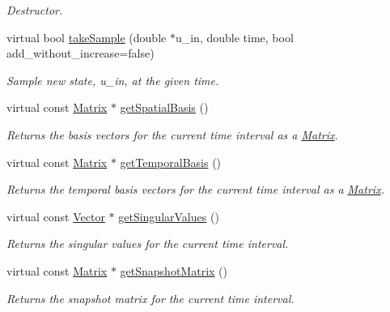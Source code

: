 \begin{DoxyCompactItemize}
\begin{DoxyCompactList}\small\item\em Destructor. \end{DoxyCompactList}\item 
virtual bool \hyperlink{class_c_a_r_o_m_1_1_incremental_s_v_d_ae9a4f1868de20c86bf1cf06352f9ce6c}{take\-Sample} (double $\ast$u\-\_\-in, double time, bool add\-\_\-without\-\_\-increase=false)
\begin{DoxyCompactList}\small\item\em Sample new state, u\-\_\-in, at the given time. \end{DoxyCompactList}\item 
virtual const \hyperlink{class_c_a_r_o_m_1_1_matrix}{Matrix} $\ast$ \hyperlink{class_c_a_r_o_m_1_1_incremental_s_v_d_a97b0d351b594c3fec9d335bac66c7894}{get\-Spatial\-Basis} ()
\begin{DoxyCompactList}\small\item\em Returns the basis vectors for the current time interval as a \hyperlink{class_c_a_r_o_m_1_1_matrix}{Matrix}. \end{DoxyCompactList}\item 
virtual const \hyperlink{class_c_a_r_o_m_1_1_matrix}{Matrix} $\ast$ \hyperlink{class_c_a_r_o_m_1_1_incremental_s_v_d_a4834472cedc628b07407ef2c0974e69d}{get\-Temporal\-Basis} ()
\begin{DoxyCompactList}\small\item\em Returns the temporal basis vectors for the current time interval as a \hyperlink{class_c_a_r_o_m_1_1_matrix}{Matrix}. \end{DoxyCompactList}\item 
virtual const \hyperlink{class_c_a_r_o_m_1_1_vector}{Vector} $\ast$ \hyperlink{class_c_a_r_o_m_1_1_incremental_s_v_d_a6d5e37fe8e408db06eb01315e0a7586c}{get\-Singular\-Values} ()
\begin{DoxyCompactList}\small\item\em Returns the singular values for the current time interval. \end{DoxyCompactList}\item 
virtual const \hyperlink{class_c_a_r_o_m_1_1_matrix}{Matrix} $\ast$ \hyperlink{class_c_a_r_o_m_1_1_incremental_s_v_d_adaa947ef95ea99f1af5113a9b3461215}{get\-Snapshot\-Matrix} ()
\begin{DoxyCompactList}\small\item\em Returns the snapshot matrix for the current time interval. \end{DoxyCompactList}\end{DoxyCompactItemize}
